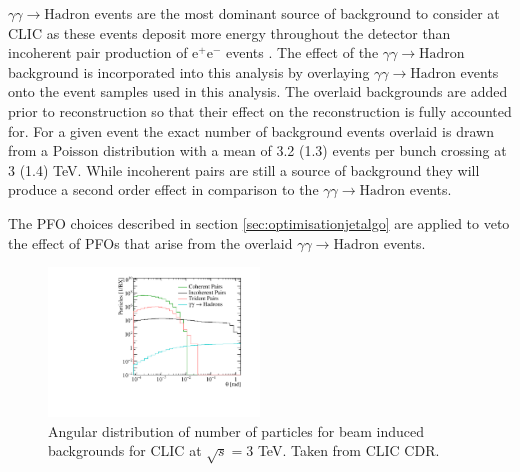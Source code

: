 $\gamma\gamma \rightarrow \text{Hadron}$ events are the most dominant source of background to consider at CLIC as these events deposit more energy throughout the detector than incoherent pair production of $\text{e}^{+}\text{e}^{-}$ events \cite{Linssen:2012hp}.  The effect of the $\gamma\gamma \rightarrow \text{Hadron}$ background is incorporated into this analysis by overlaying $\gamma\gamma \rightarrow \text{Hadron}$ events onto the event samples used in this analysis.  The overlaid backgrounds are added prior to reconstruction so that their effect on the reconstruction is fully accounted for.  For a given event the exact number of background events overlaid is drawn from a Poisson distribution with a mean of 3.2 (1.3) events per bunch crossing at 3 (1.4) TeV.  While incoherent pairs are still a source of background they will produce a second order effect in comparison to the $\gamma\gamma \rightarrow \text{Hadron}$ events.

The PFO choices described in section \ref{sec:optimisationjetalgo} are applied to veto the effect of PFOs that arise from the overlaid $\gamma\gamma \rightarrow \text{Hadron}$ events.

\begin{figure}
\includegraphics[width=0.5\textwidth]{FutureLinearColliders/Plots/CDRPlots/BackgroundAngleCut.pdf}
\caption[]{Angular distribution of number of particles for beam induced backgrounds for CLIC at $\sqrt{s} = 3$ TeV.  Taken from CLIC CDR.}
\label{fig:backgroundangle}
\end{figure}

